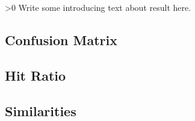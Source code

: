 \ifnum\printdraft>0
	Write some introducing text about result here.
\fi

\subsection{Confusion Matrix}

\subsection{Hit Ratio}

\subsection{Similarities}
